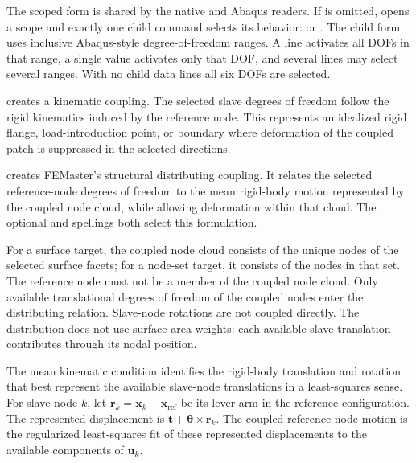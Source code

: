 The scoped form is shared by the native and Abaqus readers. If  is omitted,  opens a scope and exactly one child command selects its behavior:  or . The child form uses inclusive Abaqus-style degree-of-freedom ranges. A line  activates all DOFs in that range, a single value activates only that DOF, and several lines may select several ranges. With no child data lines all six DOFs are selected.

 creates a kinematic coupling. The selected slave degrees of freedom follow the rigid kinematics induced by the reference node. This represents an idealized rigid flange, load-introduction point, or boundary where deformation of the coupled patch is suppressed in the selected directions.

 creates FEMaster's structural distributing coupling. It relates the selected reference-node degrees of freedom to the mean rigid-body motion represented by the coupled node cloud, while allowing deformation within that cloud. The optional  and  spellings both select this  formulation.

For a surface target, the coupled node cloud consists of the unique nodes of the selected surface facets; for a node-set target, it consists of the nodes in that set. The reference node must not be a member of the coupled node cloud. Only available translational degrees of freedom of the coupled nodes enter the distributing relation. Slave-node rotations are not coupled directly. The distribution does not use surface-area weights: each available slave translation contributes through its nodal position.

The mean kinematic condition identifies the rigid-body translation and rotation that best represent the available slave-node translations in a least-squares sense. For slave node \(k\), let \(\boldsymbol r_k=\boldsymbol x_k-\boldsymbol x_{\mathrm{ref}}\) be its lever arm in the reference configuration. The represented displacement is \(\boldsymbol t+\boldsymbol\theta\times\boldsymbol r_k\). The coupled reference-node motion is the regularized least-squares fit of these represented displacements to the available components of \(\boldsymbol u_k\).

